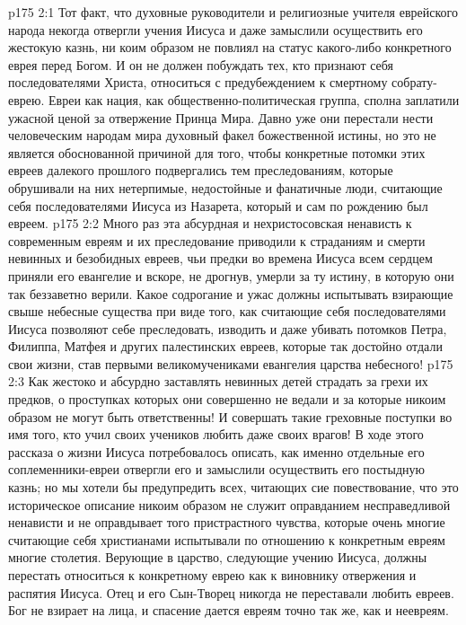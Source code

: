\vs p175 2:1 Тот факт, что духовные руководители и религиозные учителя еврейского народа некогда отвергли учения Иисуса и даже замыслили осуществить его жестокую казнь, ни коим образом не повлиял на статус какого\hyp{}либо конкретного еврея перед Богом. И он не должен побуждать тех, кто признают себя последователями Христа, относиться с предубеждением к смертному собрату\hyp{}еврею. Евреи как нация, как общественно\hyp{}политическая группа, сполна заплатили ужасной ценой за отвержение Принца Мира. Давно уже они перестали нести человеческим народам мира духовный факел божественной истины, но это не является обоснованной причиной для того, чтобы конкретные потомки этих евреев далекого прошлого подвергались тем преследованиям, которые обрушивали на них нетерпимые, недостойные и фанатичные люди, считающие себя последователями Иисуса из Назарета, который и сам по рождению был евреем.
\vs p175 2:2 Много раз эта абсурдная и нехристосовская ненависть к современным евреям и их преследование приводили к страданиям и смерти невинных и безобидных евреев, чьи предки во времена Иисуса всем сердцем приняли его евангелие и вскоре, не дрогнув, умерли за ту истину, в которую они так беззаветно верили. Какое содрогание и ужас должны испытывать взирающие свыше небесные существа при виде того, как считающие себя последователями Иисуса позволяют себе преследовать, изводить и даже убивать потомков Петра, Филиппа, Матфея и других палестинских евреев, которые так достойно отдали свои жизни, став первыми великомучениками евангелия царства небесного!
\vs p175 2:3 Как жестоко и абсурдно заставлять невинных детей страдать за грехи их предков, о проступках которых они совершенно не ведали и за которые никоим образом не могут быть ответственны! И совершать такие греховные поступки во имя того, кто учил своих учеников любить даже своих врагов! В ходе этого рассказа о жизни Иисуса потребовалось описать, как именно отдельные его соплеменники\hyp{}евреи отвергли его и замыслили осуществить его постыдную казнь; но мы хотели бы предупредить всех, читающих сие повествование, что это историческое описание никоим образом не служит оправданием несправедливой ненависти и не оправдывает того пристрастного чувства, которые очень многие считающие себя христианами испытывали по отношению к конкретным евреям многие столетия. Верующие в царство, следующие учению Иисуса, должны перестать относиться к конкретному еврею как к виновнику отвержения и распятия Иисуса. Отец и его Сын\hyp{}Творец никогда не переставали любить евреев. Бог не взирает на лица, и спасение дается евреям точно так же, как и неевреям.
